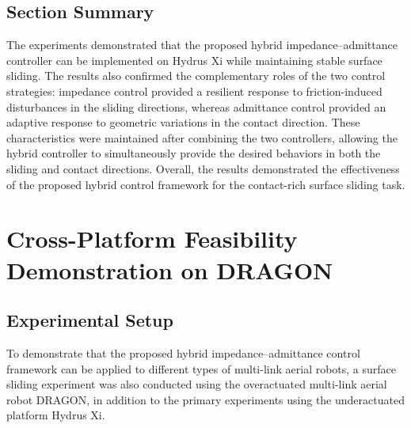\subsection{Section Summary}
The experiments demonstrated that the proposed hybrid impedance--admittance controller can be implemented on Hydrus Xi while maintaining stable surface sliding. The results also confirmed the complementary roles of the two control strategies: impedance control provided a resilient response to friction-induced disturbances in the sliding directions, whereas admittance control provided an adaptive response to geometric variations in the contact direction. These characteristics were maintained after combining the two controllers, allowing the hybrid controller to simultaneously provide the desired behaviors in both the sliding and contact directions. Overall, the results demonstrated the effectiveness of the proposed hybrid control framework for the contact-rich surface sliding task.

\section{Cross-Platform Feasibility Demonstration on DRAGON}
\subsection{Experimental Setup}


To demonstrate that the proposed hybrid impedance--admittance control framework can be applied to different types of multi-link aerial robots, a surface sliding experiment was also conducted using the overactuated multi-link aerial robot DRAGON, in addition to the primary experiments using the underactuated platform Hydrus Xi.


